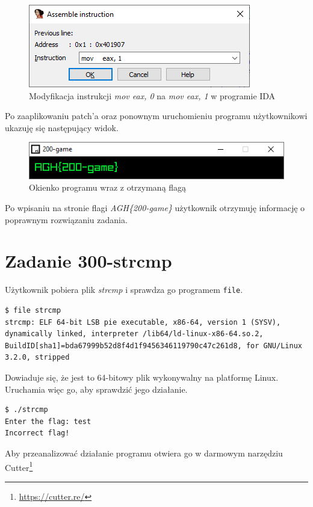 \documentclass[language=polish,type=eng]{aghmodern}
\begin{document}
\begin{figure}[H]
\centering
\includegraphics{200_ida_patch}
\caption{Modyfikacja instrukcji \emph{mov eax, 0} na \emph{mov eax, 1} w programie IDA}
\end{figure}

Po zaaplikowaniu patch'a oraz ponownym uruchomieniu programu użytkownikowi ukazuję się
następujący widok.

\begin{figure}[H]
\centering
\includegraphics{200_flag}
\caption{Okienko programu wraz z otrzymaną flagą}
\end{figure}

Po wpisaniu na stronie flagi \emph{AGH\{200-game\}} użytkownik otrzymuję informację
o poprawnym rozwiązaniu zadania.

\section{Zadanie 300-strcmp}

Użytkownik pobiera plik \emph{strcmp} i sprawdza go programem \texttt{file}.

\begin{verbatim}
$ file strcmp
strcmp: ELF 64-bit LSB pie executable, x86-64, version 1 (SYSV), dynamically linked, interpreter /lib64/ld-linux-x86-64.so.2, BuildID[sha1]=bda67999b52d8f4d1f9456346119790c47c261d8, for GNU/Linux 3.2.0, stripped
\end{verbatim}

Dowiaduje się, że jest to 64-bitowy plik wykonywalny na platformę Linux.
Uruchamia więc go, aby sprawdzić jego działanie.

\begin{verbatim}
$ ./strcmp
Enter the flag: test
Incorrect flag!
\end{verbatim}

Aby przeanalizować działanie programu otwiera go w darmowym narzędziu Cutter\footnote{\url{https://cutter.re/}}
\end{document}
